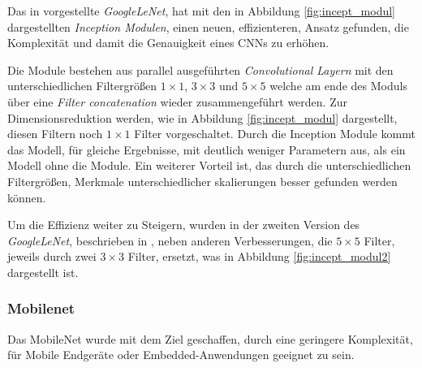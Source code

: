 Das in \cite{szegedyGoingDeeperConvolutions2014} 
vorgestellte \textit{GoogleLeNet}, hat mit den in 
Abbildung \ref{fig:incept_modul} dargestellten
\textit{Inception Modulen}, einen neuen, 
effizienteren, Ansatz gefunden, die 
Komplexität und damit die Genauigkeit eines 
CNNs zu erhöhen.

Die Module bestehen aus parallel ausgeführten 
\textit{Convolutional Layern} mit den 
unterschiedlichen Filtergrößen $1\times1$,
 $3\times3$ und $5\times5$ welche 
am ende des Moduls über eine \textit{Filter 
concatenation} wieder zusammengeführt werden.
Zur Dimensionsreduktion werden, wie in 
Abbildung \ref{fig:incept_modul} dargestellt,
diesen Filtern noch $1\times1$ Filter vorgeschaltet.
Durch die Inception Module kommt das Modell, 
für gleiche Ergebnisse, mit deutlich weniger 
Parametern aus, als ein Modell ohne die Module.
Ein weiterer Vorteil ist, das durch die 
unterschiedlichen Filtergrößen, Merkmale 
unterschiedlicher skalierungen besser gefunden 
werden können.

Um die Effizienz weiter zu Steigern, wurden in 
der zweiten Version des \textit{GoogleLeNet}, beschrieben in
\cite{szegedyRethinkingInceptionArchitecture2015},
neben anderen Verbesserungen, die 
$5\times5$ Filter, jeweils durch zwei $3\times3$ Filter, 
ersetzt, was in Abbildung \ref{fig:incept_modul2}
dargestellt ist.
\vspace{1cm}

\begin{minipage}{0.45\textwidth}
    \centering
    
    \label{fig:incept_modul}
\end{minipage}
\begin{minipage}{0.1\textwidth}
    \hfill
\end{minipage}
\begin{minipage}{0.45\textwidth}
    \centering
    
    \label{fig:incept_modul2}
\end{minipage}

\newpage
\subsubsection{Mobilenet}
Das MobileNet \cite{howardMobileNetsEfficientConvolutional2017a}
wurde mit dem Ziel geschaffen, durch eine geringere 
Komplexität, für Mobile Endgeräte oder Embedded-Anwendungen 
geeignet zu sein.

